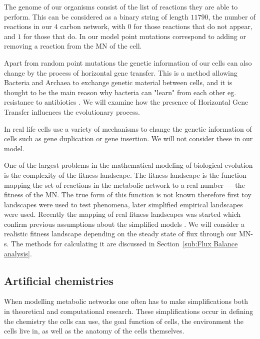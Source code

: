 \documentclass[a4paper,12pt]{article}
\begin{document}
	The genome of our organisms consist of the list of reactions they are able to perform. This can be considered as a binary string of length $11790$, the number of reactions in our $4$ carbon network, with $0$ for those reactions that do not appear, and $1$ for those that do. In our model point mutations correspond to adding or removing a reaction from the MN of the cell.

	Apart from random point mutations  the genetic information of our cells can also change by the process of horizontal gene transfer. This is a method allowing Bacteria and Archaea to exchange genetic material between cells, and it is thought to be the main reason why bacteria can "learn" from each other eg. resistance to antibiotics \cite{horizontalAntibiotics}\cite{horizontalgenetransfer}. We will examine how the presence of Horizontal Gene Transfer influences the evolutionary process.

	In real life cells use a variety of mechanisms to change the genetic information of cells such as gene duplication or gene insertion. We will not consider these in our model. 


	One of the largest problems in the mathematical modeling of biological evolution is the complexity of the fitness landscape. The fitness landscape is the function mapping the set of reactions in the metabolic network to a real number --- the fitness of the MN. The true form of this function is not known therefore first toy landscapes were used to test phenomena, later simplified empirical landscapes were used. Recently the mapping of real fitness landscapes was started which confirm previous assumptions about the simplified models \cite{fitnesslandscape}. We will consider a realistic fitness landscape depending on the steady state of flux through our MN-s. The methods for calculating it are discussed in Section~\ref{sub:Flux Balance analysis}.

	\subsection{Artificial chemistries}
	\label{sub:artificial_chemistries}


	When modelling metabolic networks one often has to make simplifications both in theoretical and computational research. These simplifications occur in defining the chemistry the cells can use, the goal function of cells, the environment the cells live in, as well as the anatomy of the cells themselves. %
	
\end{document}
